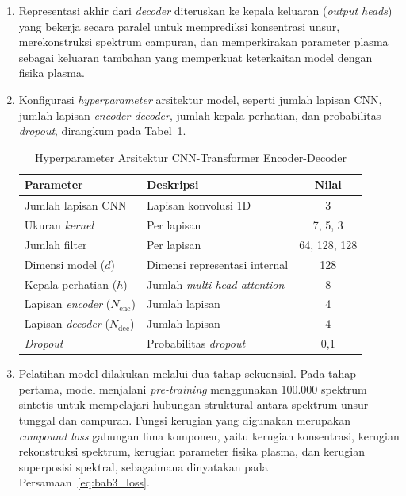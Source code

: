 \begin{enumerate}
    \item Representasi akhir dari \textit{decoder} diteruskan ke kepala keluaran (\textit{output heads}) yang bekerja secara paralel untuk memprediksi konsentrasi unsur, merekonstruksi spektrum campuran, dan memperkirakan parameter plasma sebagai keluaran tambahan yang memperkuat keterkaitan model dengan fisika plasma.

    \item Konfigurasi \textit{hyperparameter} arsitektur model, seperti jumlah lapisan CNN, jumlah lapisan \textit{encoder-decoder}, jumlah kepala perhatian, dan probabilitas \textit{dropout}, dirangkum pada Tabel~\ref{tab:hyperparameter_model}.

  \begin{table}[H]
  \centering
  \caption{Hyperparameter Arsitektur CNN-Transformer Encoder-Decoder}
  \label{tab:hyperparameter_model}
  \small
  \begin{tabular}{|l|l|c|}
    \hline
    \textbf{Parameter} & \textbf{Deskripsi} & \textbf{Nilai} \\
    \hline
    Jumlah lapisan CNN & Lapisan konvolusi 1D & 3 \\
    \hline
    Ukuran \textit{kernel} & Per lapisan & 7, 5, 3 \\
    \hline
    Jumlah filter & Per lapisan & 64, 128, 128 \\
    \hline
    Dimensi model ($d$) & Dimensi representasi internal & 128 \\
    \hline
    Kepala perhatian ($h$) & Jumlah \textit{multi-head attention} & 8 \\
    \hline
    Lapisan \textit{encoder} ($N_{\mathrm{enc}}$) & Jumlah lapisan & 4 \\
    \hline
    Lapisan \textit{decoder} ($N_{\mathrm{dec}}$) & Jumlah lapisan & 4 \\
    \hline
    \textit{Dropout} & Probabilitas \textit{dropout} & 0,1 \\
    \hline
  \end{tabular}
\end{table}
    \item Pelatihan model dilakukan melalui dua tahap sekuensial. Pada tahap pertama, model menjalani \textit{pre-training} menggunakan 100.000 spektrum sintetis untuk mempelajari hubungan struktural antara spektrum unsur tunggal dan campuran. Fungsi kerugian yang digunakan merupakan \textit{compound loss} gabungan lima komponen, yaitu kerugian konsentrasi, kerugian rekonstruksi spektrum, kerugian parameter fisika plasma, dan kerugian superposisi spektral, sebagaimana dinyatakan pada Persamaan~\ref{eq:bab3_loss}.


\end{enumerate}
